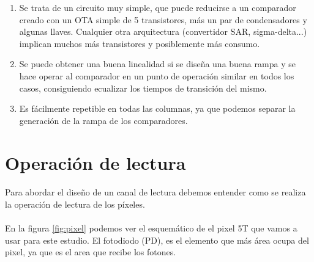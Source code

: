 \begin{enumerate}
	\item Se trata de un circuito muy simple, que puede reducirse a un comparador
	creado con un OTA simple de 5 transistores, más un par de condensadores y
	algunas llaves. Cualquier otra arquitectura (convertidor SAR, sigma-delta...)
	implican muchos más transistores y posiblemente más consumo.
	\item Se puede obtener una buena linealidad si se diseña una buena rampa
	y se hace operar al comparador en un punto de operación similar en todos los casos,
	consiguiendo ecualizar los tiempos de transición del mismo.
	\item Es fácilmente repetible en todas las columnas, ya que podemos separar
	la generación de la rampa de los comparadores.
\end{enumerate}

\section{Operación de lectura}\label{cap:ro_sch_operacion}

\paragraph{}
Para abordar el diseño de un canal de lectura debemos entender como se realiza la
operación de lectura de los píxeles.

\paragraph{}
En la figura \ref{fig:pixel} podemos ver el esquemático de el pixel 5T
que vamos a usar para este estudio. El fotodiodo (PD), es el elemento que más
área ocupa del pixel, ya que es el area que recibe los fotones.

